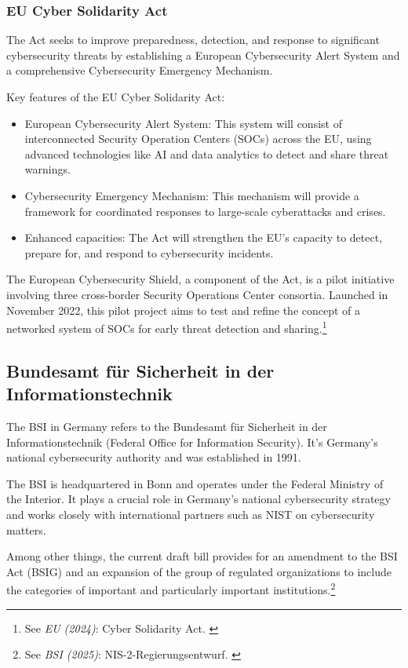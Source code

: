 \subsubsection{EU Cyber Solidarity Act}

The Act seeks to improve preparedness, detection, and response to significant cybersecurity threats by establishing a European Cybersecurity Alert System and a comprehensive Cybersecurity Emergency Mechanism.

Key features of the EU Cyber Solidarity Act:

\begin{itemize}
    \item European Cybersecurity Alert System: This system will consist of interconnected Security Operation Centers (SOCs) across the EU, using advanced technologies like AI and data analytics to detect and share threat warnings.
    \item Cybersecurity Emergency Mechanism: This mechanism will provide a framework for coordinated responses to large-scale cyberattacks and crises.
    \item Enhanced capacities: The Act will strengthen the EU's capacity to detect, prepare for, and respond to cybersecurity incidents.
\end{itemize}

The European Cybersecurity Shield, a component of the Act, is a pilot initiative involving three cross-border Security Operations Center consortia. Launched in November 2022, this pilot project aims to test and refine the concept of a networked system of SOCs for early threat detection and sharing.\footnote{See \textit{EU (2024)}: Cyber Solidarity Act. \cite{cyberSol}}

\subsection{Bundesamt für Sicherheit in der Informationstechnik}

The BSI in Germany refers to the Bundesamt für Sicherheit in der Informationstechnik (Federal Office for Information Security). It's Germany's national cybersecurity authority and was established in 1991.

The BSI is headquartered in Bonn and operates under the Federal Ministry of the Interior. It plays a crucial role in Germany's national cybersecurity strategy and works closely with international partners such as NIST on cybersecurity matters.

Among other things, the current draft bill provides for an amendment to the BSI Act (BSIG) and an expansion of the group of regulated organizations to include the categories of important and particularly important institutions.\footnote{See \textit{BSI (2025)}: NIS-2-Regierungsentwurf. \cite{presseNis2}}

